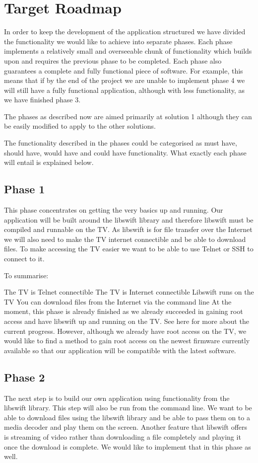 \chapter*{Target Roadmap}

In order to keep the development of the application structured we have divided the functionality 
we would like to achieve into separate phases. 
Each phase implements a relatively small and overseeable chunk of functionality 
which builds upon and requires the previous phase to be completed. 
Each phase also guarantees a complete and fully functional piece of software. 
For example, this means that if by the end of the project we are unable to implement phase 4 we will 
still have a fully functional application, although with less functionality, as we have finished phase 3.

The phases as described now are aimed primarily at solution 1 although they can be easily modified to 
apply to the other solutions.

The functionality described in the phases could be categorised as must have, 
should have, would have and could have functionality. What exactly each phase will entail is explained below.

\section*{Phase 1}
This phase concentrates on getting the very basics up and running. 
Our application will be built around the libswift library and therefore 
libswift must be compiled and runnable on the TV. 
As libswift is for file transfer over the Internet we will also need to make the 
TV internet connectible and be able to download files. 
To make accessing the TV easier we want to be able to use Telnet or SSH to connect to it.

To summarise:

The TV is Telnet connectible
The TV is Internet connectible
Libswift runs on the TV
You can download files from the Internet via the command line
At the moment, this phase is already finished as we already succeeded in gaining root access and 
have libswift up and running on the TV. See here for more about the current progress.
However, although we already have root access on the TV, 
we would like to find a method to gain root access on the newest firmware currently 
available so that our application will be compatible with the latest software. 

\section*{Phase 2}
The next step is to build our own application using functionality from the libswift library. 
This step will also be run from the command line. 
We want to be able to download files using the libswift library and 
be able to pass them on to a media decoder and play them on the screen. 
Another feature that libswift offers is streaming of video rather than 
downloading a file completely and playing it once the download is complete. 
We would like to implement that in this phase as well.

